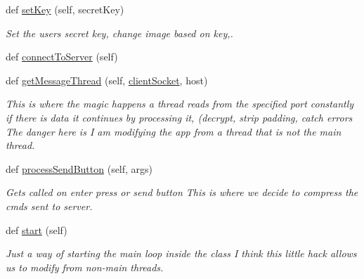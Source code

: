 \begin{DoxyCompactItemize}
def \hyperlink{classgui_version_1_1_chat_client_g_u_i_ad0b24322eeb5217d9410ee68fb054d42}{set\+Key} (self, secret\+Key)
\begin{DoxyCompactList}\small\item\em Set the users secret key, change image based on key,. \end{DoxyCompactList}\item 
def \hyperlink{classgui_version_1_1_chat_client_g_u_i_a976bddea0e9e23dd9e2245aa002a354f}{connect\+To\+Server} (self)
\item 
def \hyperlink{classgui_version_1_1_chat_client_g_u_i_a8de44a4f22866fe79ee14d0536120fa4}{get\+Message\+Thread} (self, \hyperlink{classgui_version_1_1_chat_client_g_u_i_ad0d119fff1856994d498e1e9861451d5}{client\+Socket}, host)
\begin{DoxyCompactList}\small\item\em This is where the magic happens a thread reads from the specified port constantly if there is data it continues by processing it, (decrypt, strip padding, catch errors The danger here is I am modifying the app from a thread that is not the main thread. \end{DoxyCompactList}\item 
def \hyperlink{classgui_version_1_1_chat_client_g_u_i_afbeef14d848917e111de1d91e325662c}{process\+Send\+Button} (self, args)
\begin{DoxyCompactList}\small\item\em Gets called on enter press or send button This is where we decide to compress the cmds sent to server. \end{DoxyCompactList}\item 
def \hyperlink{classgui_version_1_1_chat_client_g_u_i_a0211f17468f8c004ca4d22dec90f6e5f}{start} (self)
\begin{DoxyCompactList}\small\item\em Just a way of starting the main loop inside the class I think this little hack allows us to modify from non-\/main threads. \end{DoxyCompactList}\end{DoxyCompactItemize}
